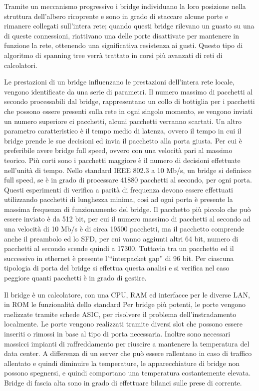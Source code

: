 \documentclass{article}
\numberwithin{equation}{subsection}
\begin{document}
Tramite un meccanismo progressivo i bridge individuano la loro posizione nella struttura dell'albero ricoprente e sono in grado di staccare alcune porte e rimanere 
collegati sull'intera rete; quando questi bridge rilevano un guasto su una di queste connessioni, riattivano una delle porte disattivate per mantenere in funzione la 
rete, ottenendo una significativa resistenza ai gusti. 
Questo tipo di algoritmo di spanning tree verrà trattato in corsi più avanzati di reti di calcolatori. 

Le prestazioni di un bridge influenzano le prestazioni dell'intera rete locale, vengono identificate da una serie di parametri. Il numero massimo di pacchetti al 
secondo processabili dal bridge, rappresentano un collo di bottiglia per i pacchetti che possono essere presenti sulla rete in ogni singolo momento, se vengono 
inviati un numero superiore ci pacchetti, alcuni pacchetti verranno scartati. Un altro parametro caratteristico è il tempo medio di latenza, ovvero il tempo in cui il 
bridge prende le sue decisioni ed invia il pacchetto alla porta giusta. 
Per cui è preferibile avere bridge full speed, ovvero con una velocità pari al massimo teorico. Più corti sono i pacchetti maggiore è il numero di decisioni 
effettuate nell'unità di tempo. Nello standard IEEE 802.3 a 10 Mb/s, un bridge si definisce full speed, se è in grado di processare 41880 pacchetti al secondo, 
per ogni porta. Questi esperimenti di verifica a parità di frequenza devono essere effettuati utilizzando pacchetti di lunghezza minima, così ad ogni porta è presente 
la massima frequenza di funzionamento del bridge. 
Il pacchetto più piccolo che può essere inviato è da 512 bit, per cui il numero massimo di pacchetti al secondo ad una 
velocità di 10 Mb/s è di circa 19500 pacchetti, ma il pacchetto comprende anche il preambolo ed lo SFD, per cui vanno aggiunti altri 64 bit, 
numero di pacchetti al secondo scende quindi a 17300. 
Tuttavia tra un pacchetto ed il successivo in ethernet è presente l'``interpacket gap'' di 96 bit. 
Per ciascuna tipologia di porta del bridge si effettua questa analisi e si verifica nel caso peggiore quanti pacchetti è in grado di gestire. 


Il bridge è un calcolatore, con una CPU, RAM ed interfacce per le diverse LAN, in ROM le funzionalità dello standard %
Per bridge più potenti, le  porte vengono raelizzate tramite schede ASIC, per risolvere il problema dell'instradamento localmente. Le porte vengono realizzati tramite 
diversi slot che possono essere inseriti o rimossi in base al tipo di porta necessaria. Inoltre sono necessari massicci impianti di raffreddamento per riuscire a 
mantenere la temperatura del data center. A differenza di un server che può essere rallentano in caso di traffico allentato e quindi diminuire la temperature, le apparecchiature di bridge non possono 
spegnersi, e quindi comportano una temperatura costantemente elevata. Bridge di fascia alta sono in grado di effettuare bilanci sulle prese di corrente. 
\end{document}
